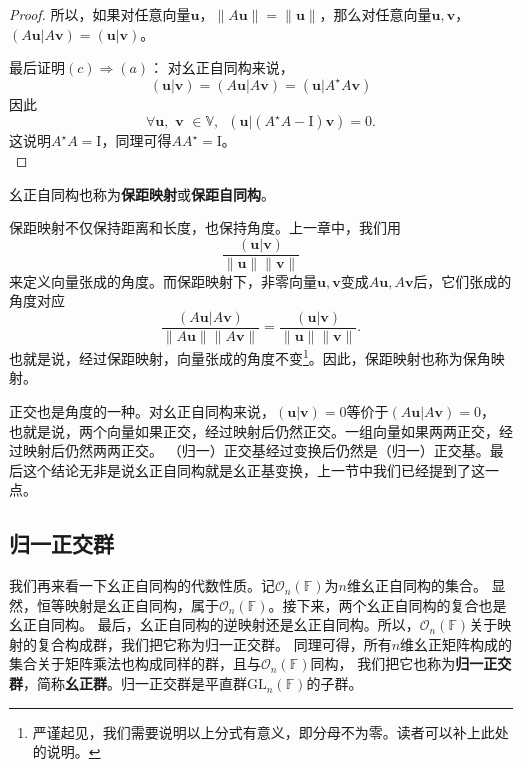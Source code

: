 \documentclass[12pt,UTF8]{ctexbook}
\begin{document}
\begin{proof}
所以，如果对任意向量$\mathbf{u}$，$\|A\mathbf{u}\| = \|\mathbf{u}\|$，那么对任意向量$\mathbf{u}, \mathbf{v}$，$(A\mathbf{u}|A\mathbf{v}) = (\mathbf{u}|\mathbf{v})$。

最后证明$(c) \Rightarrow (a)$：
对幺正自同构来说，
$$(\mathbf{u} | \mathbf{v}) = (A\mathbf{u} | A\mathbf{v}) = (\mathbf{u} | A^\star A\mathbf{v})$$
因此
$$  \forall \mathbf{u}, \,\, \mathbf{v} \,\, \in \mathbb{V},\,\,\, (\mathbf{u} | (A^\star A - \mathrm{I})\mathbf{v}) = 0.$$
这说明$A^\star A = \mathrm{I}$，同理可得$ A A^\star = \mathrm{I}$。\\
\end{proof}


幺正自同构也称为\textbf{保距映射}或\textbf{保距自同构}。

保距映射不仅保持距离和长度，也保持角度。上一章中，我们用
$$\frac{(\mathbf{u}|\mathbf{v})}{\|\mathbf{u}\|\|\mathbf{v}\|}$$
来定义向量张成的角度。而保距映射下，非零向量$\mathbf{u}, \mathbf{v}$变成$A\mathbf{u}, A\mathbf{v}$后，它们张成的角度对应
$$\frac{(A\mathbf{u}|A\mathbf{v})}{\|A\mathbf{u}\|\|A\mathbf{v}\|} = \frac{(\mathbf{u}|\mathbf{v})}{\|\mathbf{u}\|\|\mathbf{v}\|}.$$
也就是说，经过保距映射，向量张成的角度不变\footnote{严谨起见，我们需要说明以上分式有意义，即分母不为零。读者可以补上此处的说明。}。因此，保距映射也称为保角映射。

正交也是角度的一种。对幺正自同构来说，$(\mathbf{u}|\mathbf{v}) = 0$等价于$(A\mathbf{u}|A\mathbf{v}) = 0$，
也就是说，两个向量如果正交，经过映射后仍然正交。一组向量如果两两正交，经过映射后仍然两两正交。
（归一）正交基经过变换后仍然是（归一）正交基。最后这个结论无非是说幺正自同构就是幺正基变换，上一节中我们已经提到了这一点。

\subsection{归一正交群}
我们再来看一下幺正自同构的代数性质。记$\mathcal{O}_n(\mathbb{F})$为$n$维幺正自同构的集合。
显然，恒等映射是幺正自同构，属于$\mathcal{O}_n(\mathbb{F})$。接下来，两个幺正自同构的复合也是幺正自同构。
最后，幺正自同构的逆映射还是幺正自同构。所以，$\mathcal{O}_n(\mathbb{F})$关于映射的复合构成群，我们把它称为归一正交群。
同理可得，所有$n$维幺正矩阵构成的集合关于矩阵乘法也构成同样的群，且与$\mathcal{O}_n(\mathbb{F})$同构，
我们把它也称为\textbf{归一正交群}，简称\textbf{幺正群}。归一正交群是平直群$\mathrm{GL}_n(\mathbb{F})$的子群。
\end{document}
